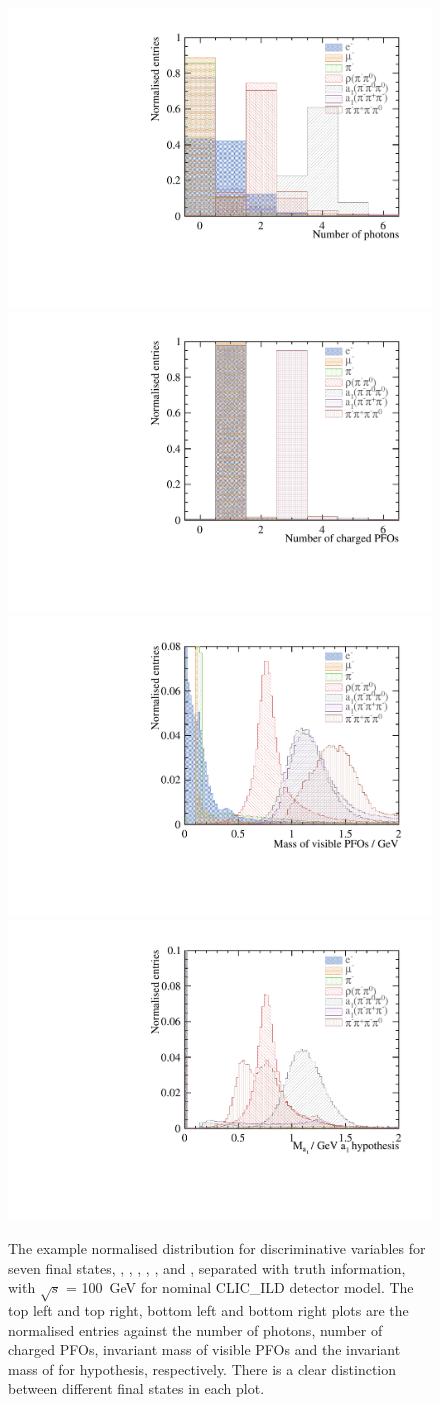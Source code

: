 \documentclass[a4paper,11pt]{article}
\newcommand{\decayElectron}{\Pem\PAGne\PGnGt}
\newcommand{\decayMuon}{\PGmm\PAGnGm\PGnGt}
\newcommand{\decayPion}{\PGpm\PGnGt}
\newcommand{\decayRho}{\PGrP{\PGpm\PGpz}\PGnGt}
\newcommand{\decayAiPhoton}{\PaDoP{\PGpm\PGpz\PGpz}\PGnGt}
\newcommand{\decayAiPion}{\PaDoP{\PGpm\PGpm\PGpp}\PGnGt}
\newcommand{\decayThreePionPhoton}{\PGpm\PGpm\PGpp\PGpz\PGnGt}
\newcommand{\decayAiPhotonShort}{\PaDoP{\PGpm\PGpz\PGpz}}
\newcommand{\rootS}{\ensuremath{\sqrt{s}} }
\begin{document}
\begin{figure}[htbp]
\centering %

\includegraphics[width=.45\textwidth]{plots/var/nPhoton_100GeV_improved} 
\qquad
\includegraphics[width=.45\textwidth]{plots/var/nCharge_100GeV_improved} 
\qquad
\includegraphics[width=.45\textwidth]{plots/var/mVis_100GeV_improved_zoom}
\qquad
\includegraphics[width=.45\textwidth]{plots/var/mA1A1Fit_100GeV_improved_zoom}
\qquad

\caption{\label{fig:nPfos} 
The example normalised distribution for discriminative variables for seven final states, \decayElectron, \decayMuon, \decayPion, \decayRho, \decayAiPhoton, \decayAiPion and \decayThreePionPhoton, separated with truth information,  with \rootS = 100 \,GeV for nominal CLIC\_ILD detector model. The top left and top right, bottom left and bottom right plots are the normalised entries against the number of photons, number of charged PFOs, invariant mass of visible PFOs and the invariant mass of \decayAiPhotonShort for \decayAiPhotonShort hypothesis, respectively. There is a clear distinction between different final states in each plot.
}
\end{figure}
\end{document}
